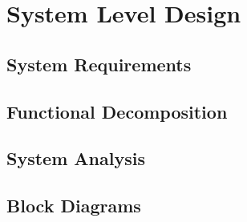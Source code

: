 \chapter{System Level Design}

\blindtext

\section{System Requirements}

\Blindtext

\section{Functional Decomposition}

\Blindtext

\section{System Analysis}

\Blindtext

\section{Block Diagrams}

\Blindtext
